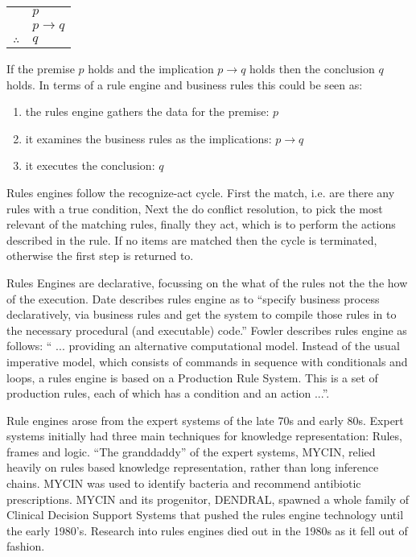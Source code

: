 \begin{tabular}{c@{\,}l@{}} 
    & $p$ \\
\arrayrulecolor{blue!60!green!70}    & $p \to q$ \\\cline{2-2}
$\therefore$         & $q$ \\
\end{tabular}

If the premise $p$ holds and the implication $p \to q$ holds then the conclusion $q$ holds.
In terms of a rule engine and business rules this could be seen as:
\begin{enumerate}
    \item the rules engine gathers the data for the premise: $p$
    \item it examines the business rules as the implications: $p \to q$
    \item it executes the conclusion: $q$
\end{enumerate}

Rules engines follow the recognize-act cycle.
First the match, i.e. are there any rules with a true condition, Next the do conflict resolution, to pick the most relevant of the matching rules, finally they act, which is to perform the actions described in the rule.
If no items are matched then the cycle is terminated, otherwise the first step is returned to.

Rules Engines are declarative, focussing on the what of the rules not the the how of the execution.
Date\cite{date2000not} describes rules engine as to ``specify business process declaratively, via business rules and get the system to compile those rules in to the necessary procedural (and executable) code.''
Fowler\cite{Fowler_rulesEngine} describes rules engine as follows: `` ... providing an alternative computational model.
Instead of the usual imperative model, which consists of commands in sequence with conditionals and loops, a rules engine is based on a Production Rule System.
This is a set of production rules, each of which has a condition and an action ...''.

Rule engines arose from the expert systems of the late 70s and early 80s.
Expert systems initially had three main techniques for knowledge representation: Rules, frames and logic\cite{jackson1986introduction}.
``The granddaddy'' of the expert systems, MYCIN, relied heavily on rules based knowledge representation\cite{shortliffe1974mycin}, rather than long inference chains.
MYCIN was used to identify bacteria and recommend antibiotic prescriptions.
MYCIN and its progenitor, DENDRAL, spawned a whole family of Clinical Decision Support Systems that pushed the rules engine technology until the early 1980's.
Research into rules engines died out in the 1980s as it fell out of fashion.

